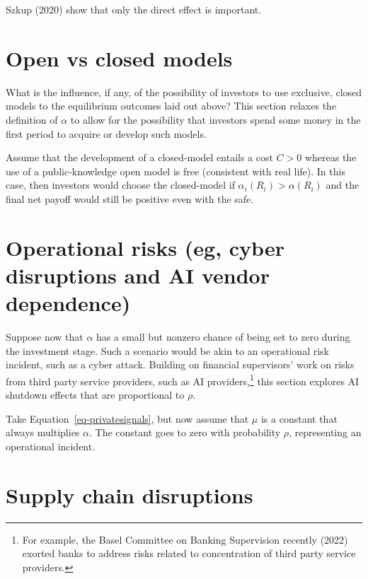 \documentclass[
]{article}
\theoremstyle{plain}
\theoremstyle{remark}
\begin{document}
Szkup (2020) show that only the direct effect is important.

\hypertarget{sec-closedmodels}{%
\section{Open vs closed models}\label{sec-closedmodels}}

What is the influence, if any, of the possibility of investors to use
exclusive, closed models to the equilibrium outcomes laid out above?
This section relaxes the definition of \(\alpha\) to allow for the
possibility that investors spend some money in the first period to
acquire or develop such models.

Assume that the development of a closed-model entails a cost \(C > 0\)
whereas the use of a public-knowledge open model is free (consistent
with real life). In this case, then investors would choose the
closed-model if \(\alpha_i(R_i) > \alpha(R_i)\) and the final net payoff
would still be positive even with the safe.

\hypertarget{operational-risks-eg-cyber-disruptions-and-ai-vendor-dependence}{%
\section{Operational risks (eg, cyber disruptions and AI vendor
dependence)}\label{operational-risks-eg-cyber-disruptions-and-ai-vendor-dependence}}

Suppose now that \(\alpha\) has a small but nonzero chance of being set
to zero during the investment stage. Such a scenario would be akin to an
operational risk incident, such as a cyber attack. Building on financial
supervisors' work on risks from third party service providers, such as
AI providers,\footnote{For example, the Basel Committee on Banking
  Supervision recently (2022) exorted banks to address risks related to
  concentration of third party service providers.} this section explores
AI shutdown effects that are proportional to \(\rho\).

Take Equation~\ref{eq-privatesignals}, but now assume that \(\mu\) is a
constant that always multiplies \(\alpha\). The constant goes to zero
with probability \(\rho\), representing an operational incident.

\hypertarget{supply-chain-disruptions}{%
\section{Supply chain disruptions}\label{supply-chain-disruptions}}
\end{document}
